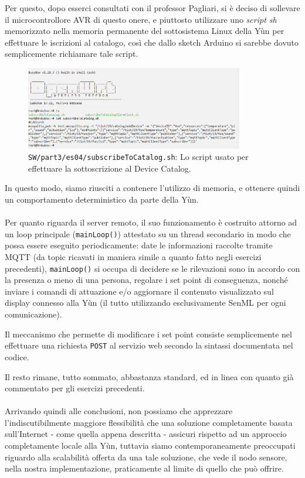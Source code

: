 \documentclass[12pt,a4paper]{article}
\begin{document}
Per questo, dopo esserci consultati con il professor Pagliari, si è deciso di sollevare il microcontrollore AVR di questo onere, e piuttosto utilizzare uno \textit{script sh} memorizzato nella memoria permanente del sottosistema Linux della Yùn per effettuare le iscrizioni al catalogo, così che dallo sketch Arduino si sarebbe dovuto semplicemente richiamare tale script.

\begin{figure}[htbp]
    \centering
    \includegraphics[width=0.85\textwidth]{sh.png}
    \caption*{\texttt{SW/part3/es04/subscribeToCatalog.sh}: Lo script usato per effettuare la sottoscrizione al Device Catalog.}
    \label{fig:sh}
\end{figure}

In questo modo, siamo riusciti a contenere l'utilizzo di memoria, e ottenere quindi un comportamento deterministico da parte della Yùn.
\\ \\
Per quanto riguarda il server remoto, il suo funzionamento è costruito attorno ad un loop principale (\verb|mainLoop()|) attestato su un thread secondario in modo che possa essere eseguito periodicamente: date le informazioni raccolte tramite MQTT (da topic ricavati in maniera simile a quanto fatto negli esercizi precedenti), \verb|mainLoop()| si occupa di decidere se le rilevazioni sono in accordo con la presenza o meno di una persona, regolare i set point di conseguenza, nonché inviare i comandi di attuazione e/o aggiornare il contenuto visualizzato sul display connesso alla Yùn (il tutto utilizzando esclusivamente SenML per ogni comunicazione).

Il meccanismo che permette di modificare i set point consiste semplicemente nel effettuare una richiesta \verb|POST| al servizio web secondo la sintassi documentata nel codice.

Il resto rimane, tutto sommato, abbastanza standard, ed in linea con quanto già commentato per gli esercizi precedenti.
\\ \\
Arrivando quindi alle conclusioni, non possiamo che apprezzare l'indiscutibilmente maggiore flessibilità che una soluzione completamente basata sull'Internet - come quella appena descritta - assicuri rispetto ad un approccio completamente locale alla Yùn, tuttavia siamo contemporaneamente preoccupati riguardo alla scalabilità offerta da una tale soluzione, che vede il nodo sensore, nella nostra implementazione, praticamente al limite di quello che può offrire.
\end{document}

